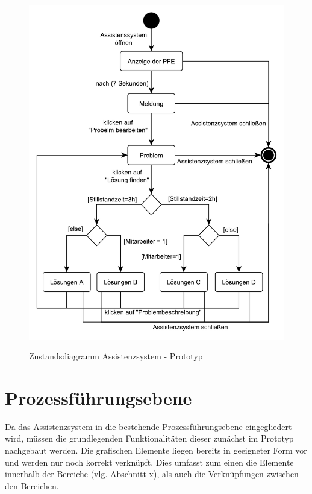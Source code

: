 \begin{figure}[htbp]
\centering
\includegraphics[scale=0.65]{DA_files/Bilder/Prototyp/Zustandsdiagramm-Assistenzsystem.pdf}
\label{pic:Zustandsdiagramm-Assistenzsystem}
\caption{Zustandsdiagramm Assistenzsystem - Prototyp}
\end{figure}

\section{Prozessführungsebene}
Da das Assistenzsystem in die bestehende Prozessführungsebene eingegliedert wird, müssen die grundlegenden Funktionalitäten dieser zunächst im Prototyp nachgebaut werden. Die grafischen Elemente liegen bereits in geeigneter Form vor und werden nur noch korrekt verknüpft. Dies umfasst zum einen die Elemente innerhalb der Bereiche (vlg. Abschnitt x), als auch die Verknüpfungen zwischen den Bereichen.

